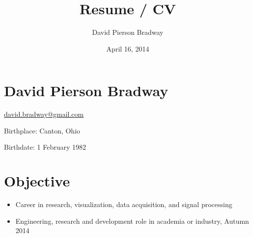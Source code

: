 \documentclass[letterpaper,10pt,english]{sphinxmanual}
\title{Resume / CV}
\date{April 16, 2014}
\author{David Pierson Bradway}
\begin{document}
\maketitle
\tableofcontents
{}\label{index::doc}



\chapter{David Pierson Bradway}
\label{resume:web-enhanced-resume-cv}\label{resume::doc}\label{resume:david-pierson-bradway}
\begin{DUlineblock}{0em}
\item[] \href{mailto:david.bradway@gmail.com}{david.bradway@gmail.com}
\item[] Birthplace: Canton, Ohio
\item[] Birthdate: 1 February 1982
\end{DUlineblock}


\chapter{Objective}
\label{resume:objective}\begin{itemize}
\item {} 
Career in research, visualization, data acquisition, and signal
processing

\item {} 
Engineering, research and development role in academia or industry,
Autumn 2014

\end{itemize}
\end{document}
